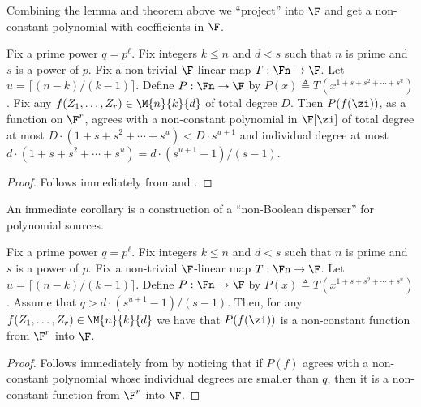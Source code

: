 Combining the lemma and theorem above we ``project'' into $\F$ and get a non-constant polynomial with
coefficients in $\F$.
\begin{theorem}\label{thm-main_const}
Fix a prime power $q=p^{\ell}$. Fix integers $k\leq n$ and $d<s$ such that $n$ is prime
and $s$ is a power of $p$. Fix a non-trivial $\F$-linear map $T:\Fn\to \F$.
Let $u= \lceil (n-k)/(k-1)\rceil $.
Define $P:\Fn\to \F$ by $P(x) \triangleq T(x^{1+s+s^2+\cdots +  s^u})$.
Fix any $f(Z_1,\ldots,Z_r)\in \M{n}{k}{d}$ of total degree $D$. Then $P(f(\zi))$, as a function
on $\F^r$, agrees with a non-constant polynomial in $\F[\zi]$ of total degree
at most $D\cdot (1+ s+ s^2 +\cdots + s^u)< D\cdot s^{u+1}$
and individual degree at most $d\cdot(1+ s+ s^2 +\cdots + s^u) = d\cdot (s^{u+1}-1)/(s-1)$.
\end{theorem}
\begin{proof}
Follows immediately from  and .
\end{proof}

An immediate corollary is a construction of a ``non-Boolean disperser'' for polynomial sources.
\begin{corollary}\label{cor-disp}
Fix a prime power $q=p^{\ell}$. Fix integers $k\leq n$ and $d<s$ such that $n$ is prime
and $s$ is a power of $p$. Fix a non-trivial $\F$-linear map $T:\Fn\to \F$.
Let $u= \lceil (n-k)/(k-1)\rceil $.
Define $P:\Fn\to \F$ by $P(x) \triangleq T(x^{1+s+s^2+\cdots +  s^u})$.
Assume that $q> d\cdot (s^{u+1}-1)/(s-1)$.
Then, for any $f(Z_1,\ldots,Z_r)\in \M{n}{k}{d}$ we have that $P(f(\zi))$ is  a non-constant function
from $\F^r$ into $\F$.
\end{corollary}
\begin{proof}
Follows immediately from  by noticing that if
$P(f)$ agrees with a non-constant polynomial whose individual degrees are smaller than $q$,
then it is a non-constant function from $\F^r$ into $\F$.
\end{proof}

